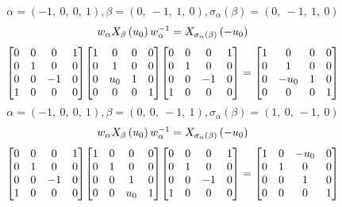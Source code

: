\documentclass[11pt]{article}
\theoremstyle{definition}
\begin{document}
\[
\alpha = \left( -1, \  0, \  0, \  1\right), \beta = \left( 0, \  -1, \  1, \  0\right), \sigma_{\alpha}(\beta) = \left( 0, \  -1, \  1, \  0\right)
\]
\[
\scaletoalign{\textwidth}{w_{\alpha} X_{\beta}\left(u_{0}\right) w_{\alpha}^{-1} = X_{\sigma_{\alpha}\left(\beta\right)}\left(- u_{0}\right)}
\]
\[
\scaletoalign{\textwidth}{{\left[\begin{matrix}0 & 0 & 0 & 1\\0 & 1 & 0 & 0\\0 & 0 & -1 & 0\\1 & 0 & 0 & 0\end{matrix}\right]} {\left[\begin{matrix}1 & 0 & 0 & 0\\0 & 1 & 0 & 0\\0 & u_{0} & 1 & 0\\0 & 0 & 0 & 1\end{matrix}\right]} {\left[\begin{matrix}0 & 0 & 0 & 1\\0 & 1 & 0 & 0\\0 & 0 & -1 & 0\\1 & 0 & 0 & 0\end{matrix}\right]} = {\left[\begin{matrix}1 & 0 & 0 & 0\\0 & 1 & 0 & 0\\0 & - u_{0} & 1 & 0\\0 & 0 & 0 & 1\end{matrix}\right]}}
\]
\[
\alpha = \left( -1, \  0, \  0, \  1\right), \beta = \left( 0, \  0, \  -1, \  1\right), \sigma_{\alpha}(\beta) = \left( 1, \  0, \  -1, \  0\right)
\]
\[
\scaletoalign{\textwidth}{w_{\alpha} X_{\beta}\left(u_{0}\right) w_{\alpha}^{-1} = X_{\sigma_{\alpha}\left(\beta\right)}\left(- u_{0}\right)}
\]
\[
\scaletoalign{\textwidth}{{\left[\begin{matrix}0 & 0 & 0 & 1\\0 & 1 & 0 & 0\\0 & 0 & -1 & 0\\1 & 0 & 0 & 0\end{matrix}\right]} {\left[\begin{matrix}1 & 0 & 0 & 0\\0 & 1 & 0 & 0\\0 & 0 & 1 & 0\\0 & 0 & u_{0} & 1\end{matrix}\right]} {\left[\begin{matrix}0 & 0 & 0 & 1\\0 & 1 & 0 & 0\\0 & 0 & -1 & 0\\1 & 0 & 0 & 0\end{matrix}\right]} = {\left[\begin{matrix}1 & 0 & - u_{0} & 0\\0 & 1 & 0 & 0\\0 & 0 & 1 & 0\\0 & 0 & 0 & 1\end{matrix}\right]}}
\]
\end{document}
